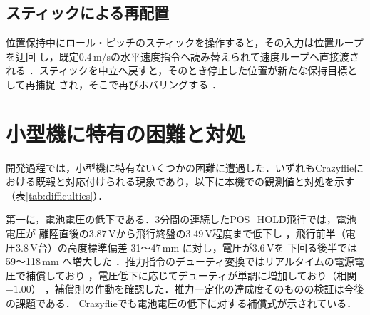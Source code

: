 \documentclass[a4paper,twocolumn,10pt]{ltjsarticle}
\begin{document}
\subsection{スティックによる再配置}

位置保持中にロール・ピッチのスティックを操作すると，その入力は位置ループを迂回
し，既定0.4\,m/sの水平速度指令へ読み替えられて速度ループへ直接渡される
．スティックを中立へ戻すと，そのとき停止した位置が新たな保持目標として再捕捉
され，そこで再びホバリングする
．

\section{小型機に特有の困難と対処}
\label{sec:difficulties}

開発過程では，小型機に特有ないくつかの困難に遭遇した．いずれもCrazyflieに
おける既報と対応付けられる現象であり，以下に本機での観測値と対処を示す
（表\ref{tab:difficulties}）．

第一に，電池電圧の低下である．3分間の連続したPOS\_HOLD飛行では，電池電圧が
離陸直後の3.87\,Vから飛行終盤の3.49\,V程度まで低下し
，飛行前半（電圧3.8\,V台）の高度標準偏差 31〜47\,mm に対し，電圧が3.6\,Vを
下回る後半では 59〜118\,mm へ増大した
．推力指令のデューティ変換ではリアルタイムの電源電圧で補償しており
，電圧低下に応じてデューティが単調に増加しており（相関$-1.00$）
，補償則の作動を確認した．推力一定化の達成度そのものの検証は今後の課題である．
Crazyflieでも電池電圧の低下に対する補償式が示されている\cite{giernacki2017}．
\end{document}
